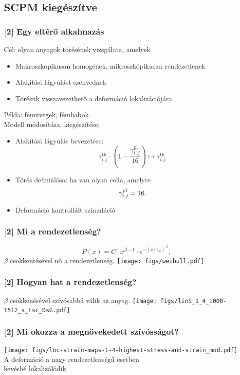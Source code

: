 \documentclass[12pt]{beamer}
\begin{document}
\subsection{SCPM kiegészítve}
\begin{frame}
\frametitle{[2] Egy eltérő alkalmazás}
Cél: olyan anyagok törésének vizsgálata, amelyek
\begin{itemize}
\item \pause Makroszkopikusan homogének, mikroszkópikusan rendezetlenek
\item Alakítási lágyulást szenvednek
\item Törésük visszavezethető a deformáció lokalizációjára
\end{itemize}
Példa: fémüvegek, fémhabok.\\
Modell módosítása, kiegészítése:
\begin{itemize}
\item \pause Alakítási lágyulás bevezetése: \[\tau _{i,j}^{{\text{th}}} \cdot \left( {1 - \frac{{\gamma _{i,j}^{{\text{pl}}}}}{{16}}} \right) \mapsto \tau _{i,j}^{{\text{th}}}\]
\item Törés definiálása: ha van olyan cella, amelyre \[\gamma_{i,j}^{{\rm{pl}}} = 16.\]
\item Deformáció kontrollált szimuláció
\end{itemize}
\end{frame}

\begin{frame}
\frametitle{[2] Mi a rendezetlenség?}
\[P\left( x \right) = C \cdot {x^{\beta  - 1}} \cdot {e^{ - {{\left( {x/{x_{{\text{sc}}}}} \right)}^\beta }}},\]
$\beta$ csökkentésével nő a rendezetlenség.
\centering
\texttt{[image: figs/weibull.pdf]}

\end{frame}


\begin{frame}
\frametitle{[2] Hogyan hat a rendezetlenség?}
$\beta$ csökkenésével szívósabbá válik az anyag.
\centering
\texttt{[image: figs/linS\_1\_4\_1000-1512\_s\_tsc\_DsG.pdf]}


\end{frame}


\begin{frame}
\frametitle{[2] Mi okozza a megnövekedett szívósságot?}
\centering
\texttt{[image: figs/loc-strain-maps-1-4-highest-stress-and-strain\_mod.pdf]}
\\
A deformáció a nagy rendezetlenségű esetben\\kevésbé lokalizálódik.
\end{frame}
\end{document}
